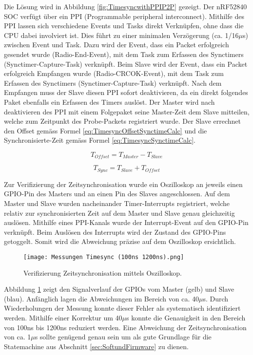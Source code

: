 Die Lösung wird in Abbildung \ref{fig:TimesyncwithPPIP2P} gezeigt. Der nRF52840 SOC verfügt über ein PPI (Programmable peripheral interconnect).
Mithilfe des PPI lassen sich verschiedene Events und Tasks direkt Verknüpfen, ohne dass die CPU dabei involviert ist.
Dies führt zu einer minimalen Verzögerung (ca. 1/16$\mu$s) zwischen Event und Task.
Dazu wird der Event, dass ein Packet erfolgreich gesendet wurde (Radio-End-Event), mit dem Task zum Erfassen des Synctimers (Synctimer-Capture-Task) verknüpft.
Beim Slave wird der Event, dass ein Packet erfolgreich Empfangen wurde (Radio-CRCOK-Event), mit dem Task zum Erfassen des Synctimers (Synctimer-Capture-Task) verknüpft.
Nach dem Empfangen muss der Slave diesen PPI sofort deaktivieren, da ein direkt folgendes Paket ebenfalls ein Erfassen des Timers auslöst.
Der Master wird nach deaktivieren des PPI mit einem Folgepaket seine Master-Zeit dem Slave mitteilen, welche zum Zeitpunkt des Probe-Packets registriert wurde. Der Slave errechnet den Offset gemäss Formel \ref{eq:TimesyncOffsetSynctimeCalc} und die Synchronisierte-Zeit gemäss Formel \ref{eq:TimesyncSynctimeCalc}. \cite{nordic_semi_nrf_infocenter_ppi_2020}

\begin{equation}\label{eq:TimesyncOffsetSynctimeCalc}
T_{Offset} =  T_{Master} - T_{Slave} 
\end{equation}

\begin{equation}\label{eq:TimesyncSynctimeCalc}
T_{Sync} =  T_{Slave} + T_{Offset} 
\end{equation}

Zur Verifizierung der Zeitsynchronisation wurde ein Oszilloskop an jeweils einen GPIO-Pin des Masters und an einen Pin des Slaves angeschlossen. Auf dem Master und Slave wurden nacheinander Timer-Interrupts registriert, welche relativ zur synchronisierten Zeit auf dem Master und Slave genau gleichzeitig auslösen. Mithilfe eines PPI-Kanals wurde der Interrupt-Event auf den GPIO-Pin verknüpft.
Beim Auslösen des Interrupts wird der Zustand des GPIO-Pins getoggelt.
Somit wird die Abweichung präzise auf dem Oszilloskop ersichtlich.

\begin{figure} [H]
	\centering
	\texttt{[image: Messungen Timesync (100ns 1200ns).png]}
	\caption{Verifizierung Zeitsynchronisation mittels Oszilloskop.}
	\label{fig:TimesyncVerifikationP2P}
\end{figure}

Abbildung \ref{fig:TimesyncVerifikationP2P} zeigt den Signalverlauf der GPIOs vom Master (gelb) und Slave (blau).
Anfänglich lagen die Abweichungen im Bereich von ca. 40$\mu$s.
Durch Wiederholungen der Messung konnte dieser Fehler als systematisch identifiziert werden.
Mithilfe einer Korrektur um 40$\mu$s konnte die Genauigkeit in den Bereich von 100ns bis 1200ns reduziert werden. Eine Abweichung der Zeitsynchronisation von ca. 1$\mu$s sollte genügend genau sein um als gute Grundlage für die Statemachine aus Abschnitt \ref{sec:SoftundFirmware} zu dienen. 
 
